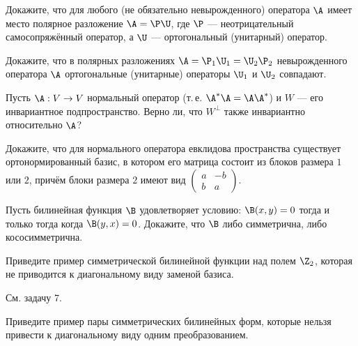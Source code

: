 \begin{problem}
    Докажите, что для любого (не обязательно невырожденного) оператора $\A$ имеет место полярное разложение $\A = \P\U$, где $\P$ --- неотрицательный самосопряжённый оператор, а $\U$ --- ортогональный (унитарный) оператор.
\end{problem}

\begin{problem}
    Докажите, что в полярных разложениях $\A = \P_1\U_1 = \U_2\P_2$ невырожденного оператора $\A$ ортогональные (унитарные) операторы $\U_1$ и $\U_2$ совпадают.
\end{problem}

\begin{problem}
    Пусть $\A: V \to V$ нормальный оператор (т.\,е. $\A^\ast\A = \A\A^\ast$) и $W$ --- его инвариантное подпространство. Верно ли, что $W^\perp$ также инвариантно относительно $\A$?
\end{problem}

\begin{problem}
    Докажите, что для нормального оператора евклидова пространства существует ортонормированный базис, в котором его матрица состоит из блоков размера $1$ или $2$, причём блоки размера $2$ имеют вид
    $
        \begin{pmatrix}
            a & -b\\
            b & a
        \end{pmatrix}
    $.
\end{problem}

\begin{problem}
    Пусть билинейная функция $\B$ удовлетворяет условию: $\B(x, y) = 0$ тогда и только тогда когда $\B(y, x) = 0$. Докажите, что $\B$ либо симметрична, либо кососимметрична.
\end{problem}

\begin{problem}
    Приведите пример симметрической билинейной функции над полем $\Z_2$, которая не приводится к диагональному виду заменой базиса.
\end{problem}

\begin{solution}
    См. задачу 7.
\end{solution}

\begin{problem}
    Приведите пример пары симметрических билинейных форм, которые нельзя привести к диагональному виду одним преобразованием.
\end{problem}

